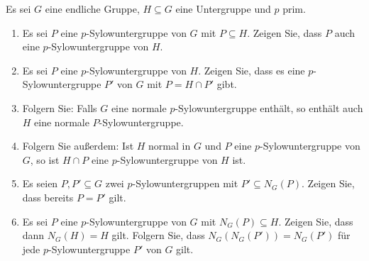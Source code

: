 \begin{question}[subtitle = Ein wenig Sylow]
  Es sei $G$ eine endliche Gruppe, $H \subseteq G$ eine Untergruppe und $p$ prim.
  \begin{enumerate}
    \item
      Es sei $P$ eine $p$-Sylow\-unter\-gruppe von $G$ mit $P \subseteq H$.
      Zeigen Sie, dass $P$ auch eine $p$-Sylow\-un\-ter\-gruppe von $H$.
    \item
      Es sei $P$ eine $p$-Sylow\-unter\-gruppe von $H$.
      Zeigen Sie, dass es eine $p$-Sylow\-un\-ter\-gruppe $P'$ von $G$ mit $P = H \cap P'$ gibt.
    \item
      Folgern Sie:
      Falls $G$ eine normale $p$-Sylow\-unter\-gruppe enthält, so enthält auch $H$ eine normale $P$-Sylow\-unter\-gruppe.
    \item
      Folgern Sie außerdem:
      Ist $H$ normal in $G$ und $P$ eine $p$-Sylow\-unter\-gruppe von $G$, so ist $H \cap P$ eine $p$-Sylow\-unter\-gruppe von $H$ ist.
    \item
      Es seien $P, P' \subseteq G$ zwei $p$-Sylow\-unter\-gruppen mit $P' \subseteq N_G(P)$.
      Zeigen Sie, dass bereits $P = P'$ gilt.
    \item
      Es sei $P$ eine $p$-Sylow\-unter\-gruppe von $G$ mit $N_G(P) \subseteq H$.
      Zeigen Sie, dass dann $N_G(H) = H$ gilt.
      Folgern Sie, dass $N_G(N_G(P')) = N_G(P')$ für jede $p$-Sylow\-un\-ter\-gruppe $P'$ von $G$ gilt.
  \end{enumerate}
\end{question}


